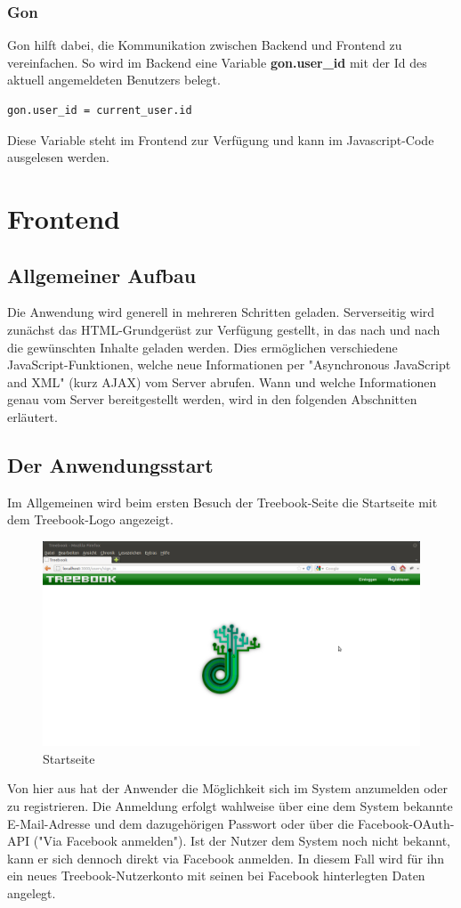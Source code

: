 \documentclass[10pt,a4paper]{book}
\makeatletter
\def\ScaleIfNeeded{%
\ifdim\Gin@nat@width>\linewidth
\linewidth
\else
\Gin@nat@width
\fi
}
\makeatother
\begin{document}
\subsection{Gon}
Gon hilft dabei, die Kommunikation zwischen Backend und Frontend zu vereinfachen. So wird im Backend eine Variable \textbf{gon.user\_id} mit der Id des aktuell angemeldeten Benutzers belegt.
\begin{lstlisting}
gon.user_id = current_user.id
\end{lstlisting}
Diese Variable steht im Frontend zur Verfügung und kann im Javascript-Code ausgelesen werden.
\chapter{Frontend}
\section{Allgemeiner Aufbau}
Die Anwendung wird generell in mehreren Schritten geladen. Serverseitig wird zunächst das HTML-Grundgerüst zur Verfügung gestellt, in das nach und nach die gewünschten Inhalte geladen werden.
Dies ermöglichen verschiedene JavaScript-Funktionen, welche neue Informationen per "Asynchronous JavaScript and XML" (kurz AJAX) vom Server abrufen.
Wann und welche Informationen genau vom Server bereitgestellt werden, wird in den folgenden Abschnitten erläutert.

\section{Der Anwendungsstart}
Im Allgemeinen wird beim ersten Besuch der Treebook-Seite die Startseite mit dem Treebook-Logo angezeigt.
\begin{figure}[htbp]
\centering
\includegraphics[width=\ScaleIfNeeded]{Pictures/screen_startup.png}%
\caption{Startseite}%
\end{figure}
Von hier aus hat der Anwender die Möglichkeit sich im System anzumelden oder zu registrieren.
Die Anmeldung erfolgt wahlweise über eine dem System bekannte E-Mail-Adresse und dem dazugehörigen Passwort oder über die Facebook-OAuth-API ("Via Facebook anmelden").
Ist der Nutzer dem System noch nicht bekannt, kann er sich dennoch direkt via Facebook anmelden. In diesem Fall wird für ihn ein neues Treebook-Nutzerkonto mit seinen bei Facebook hinterlegten Daten angelegt.
\end{document}
